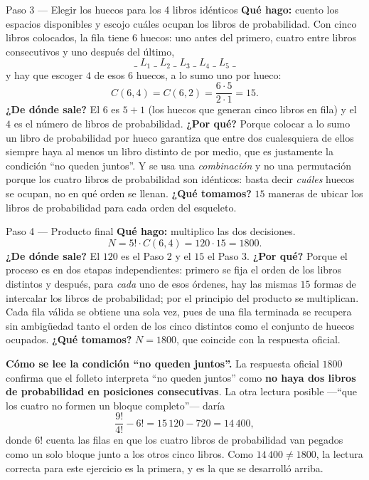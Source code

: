 \documentclass[11pt]{article}
\begin{document}
\begin{paso}{Paso 3 --- Elegir los huecos para los 4 libros idénticos}
\textbf{Qué hago:} cuento los espacios disponibles y escojo cuáles ocupan los libros de probabilidad.
Con cinco libros colocados, la fila tiene $6$ huecos: uno antes del primero, cuatro entre libros consecutivos y uno después del último,
\[
\_\;L_1\;\_\;L_2\;\_\;L_3\;\_\;L_4\;\_\;L_5\;\_
\]
y hay que escoger $4$ de esos $6$ huecos, a lo sumo uno por hueco:
\[
C(6,4)=C(6,2)=\frac{6\cdot 5}{2\cdot 1}=15 .
\]
\textbf{¿De dónde sale?} El $6$ es $5+1$ (los huecos que generan cinco libros en fila) y el $4$ es el número de libros de probabilidad.
\textbf{¿Por qué?} Porque colocar a lo sumo un libro de probabilidad por hueco garantiza que entre dos cualesquiera de ellos siempre haya al menos un libro distinto de por medio, que es justamente la condición ``no queden juntos''. Y se usa una \emph{combinación} y no una permutación porque los cuatro libros de probabilidad son idénticos: basta decir \emph{cuáles} huecos se ocupan, no en qué orden se llenan.
\textbf{¿Qué tomamos?} $15$ maneras de ubicar los libros de probabilidad para cada orden del esqueleto.
\end{paso}

\begin{paso}{Paso 4 --- Producto final}
\textbf{Qué hago:} multiplico las dos decisiones.
\[
N=5!\cdot C(6,4)=120\cdot 15=1800 .
\]
\textbf{¿De dónde sale?} El $120$ es el Paso 2 y el $15$ el Paso 3.
\textbf{¿Por qué?} Porque el proceso es en dos etapas independientes: primero se fija el orden de los libros distintos y después, para \emph{cada} uno de esos órdenes, hay las mismas $15$ formas de intercalar los libros de probabilidad; por el principio del producto se multiplican. Cada fila válida se obtiene una sola vez, pues de una fila terminada se recupera sin ambigüedad tanto el orden de los cinco distintos como el conjunto de huecos ocupados.
\textbf{¿Qué tomamos?} $N=1800$, que coincide con la respuesta oficial.
\end{paso}

\begin{nota}
\textbf{Cómo se lee la condición ``no queden juntos''.} La respuesta oficial $1800$ confirma que el folleto interpreta ``no queden juntos'' como \textbf{no haya dos libros de probabilidad en posiciones consecutivas}. La otra lectura posible —``que los cuatro no formen un bloque completo''— daría
\[
\frac{9!}{4!}-6!=15\,120-720=14\,400 ,
\]
donde $6!$ cuenta las filas en que los cuatro libros de probabilidad van pegados como un solo bloque junto a los otros cinco libros. Como $14\,400\ne 1800$, la lectura correcta para este ejercicio es la primera, y es la que se desarrolló arriba.
\end{nota}
\end{document}
